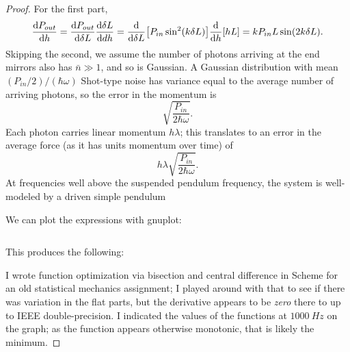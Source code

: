\documentclass{article}
\begin{document}
\begin{proof}
  For the first part,
  \[
    \dv{P_{out}}{h} = \dv{P_{out}}{\delta L}\dv{\delta L}{dh} = \dv{\delta L}\qty[P_{in}\sin^{2}(k\delta L)]\dv{h}\qty[hL]
    = kP_{in}L\sin(2k\delta L).
  \]
  Skipping the second, we assume the number of photons arriving at the end mirrors also has $\bar{n} \gg 1$, and so is Gaussian.
  A Gaussian distribution with mean $(P_{in} / 2) / (\hbar\omega)$
  Shot-type noise has variance equal to the average number of arriving photons, so the error in the momentum is
  \[
    \sqrt{\frac{P_{in}}{2\hbar\omega}}.
  \]
  Each photon carries linear momentum $h\lambda$; this translates to an error in the average force (as it has units momentum over time) of
  \[
    h\lambda\sqrt{\frac{P_{in}}{2\hbar\omega}}.
  \]
  At frequencies well above the suspended pendulum frequency, the system is well-modeled by a driven simple pendulum

  We can plot the expressions with gnuplot:
  \inputminted{gnuplot}{p1.gp}
  This produces the following:
  \begin{center}
    
  \end{center}

  I wrote function optimization via bisection and central difference in Scheme for an old statistical mechanics assignment;
  I played around with that to see if there was variation in the flat parts,
  but the derivative appears to be \textit{zero} there to up to IEEE double-precision.
  I indicated the values of the functions at $\SI{1000}{Hz}$ on the graph; as the function appears otherwise monotonic,
  that is likely the minimum.

\end{proof}
\end{document}
